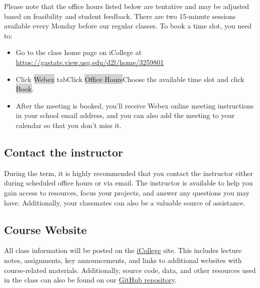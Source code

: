 \documentclass[a4paper, 12pt]{article}
\begin{document}
\begin{flushleft}
Please note that the office hours listed below are tentative and may be adjusted based on feasibility and student feedback. There are two 15-minute sessions available every Monday before our regular classes. To book a time slot, you need to:
  \begin{itemize}
    \item Go to the class home page on iCollege at \url{https://gastate.view.usg.edu/d2l/home/3259801}
    \item Click \colorbox{lightgray}{Webex} tab\textrightarrow Click \colorbox{lightgray}{Office Hours}\textrightarrow Choose the available time slot and click \colorbox{lightgray}{Book}.
    \item After the meeting is booked, you'll receive Webex online meeting instructions in your school email address, and you can also add the meeting to your calendar so that you don't miss it.
  \end{itemize}
\end{flushleft}

\subsection{Contact the instructor}
During the term, it is highly recommended that you contact the instructor either during scheduled office hours or via email. The instructor is available to help you gain access to resources, focus your projects, and answer any questions you may have. Additionally, your classmates can also be a valuable source of assistance.

\subsection{Course Website}
All class information will be posted on the \href{https://icollege.gsu.edu/}{iCollege} site. This includes lecture notes, assignments, key announcements, and links to additional websites with course-related materials. Additionally, source code, data, and other resources used in the class can also be found on our \href{https://github.com/xiangshiyin/machine-learning-for-actuarial-science}{GitHub repository}.
\end{document}
